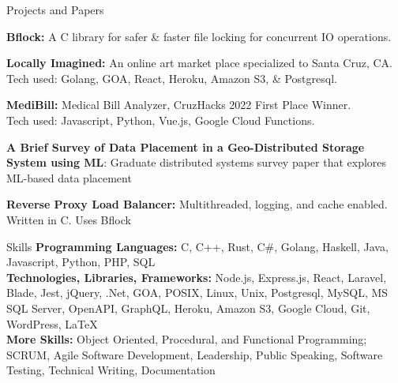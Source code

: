 \documentclass{resume} %
\begin{document}
\begin{rSection}{Projects and Papers}

    {\textbf{Bflock:}} A C library for safer \& faster file locking for concurrent IO operations.
    
    {\textbf{Locally Imagined:}} An online art market place specialized to Santa Cruz, CA.
    \\ Tech used: Golang, GOA, React, Heroku, Amazon S3, \& Postgresql.
    
    {\textbf{MediBill:}} Medical Bill Analyzer, CruzHacks 2022 First Place Winner.
    \\Tech used: Javascript, Python, Vue.js, Google Cloud Functions.
    
    {\textbf{A Brief Survey of Data Placement in a Geo-Distributed Storage System using ML}: Graduate distributed systems survey paper that explores ML-based data placement} 
    
    {\textbf{Reverse Proxy Load Balancer:} } Multithreaded, logging, and cache enabled. Written in C. Uses Bflock
\end{rSection}

\begin{rSection}{Skills}
    {\textbf{Programming Languages:} } C, C++, Rust, C\#, Golang, Haskell, Java, Javascript, Python, PHP, SQL
    \\{\textbf{Technologies, Libraries, Frameworks:} }
    Node.js, Express.js, React, Laravel, Blade, Jest, jQuery, .Net,
    GOA, POSIX, Linux, Unix, Postgresql, MySQL, MS SQL Server, OpenAPI,
    GraphQL, Heroku, Amazon S3, Google Cloud, Git, WordPress, LaTeX
    \\{\textbf{More Skills:} } Object Oriented, Procedural, and Functional Programming; SCRUM, Agile Software Development, Leadership, Public Speaking, Software Testing, Technical Writing, Documentation
\end{rSection}
    
\end{document}
